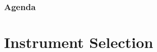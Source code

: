 
\def\PresTitle{Line Measurement}  %
\def\PresSubtitle{Baker College Engineering}         %
\def\PresAuthor{Brad Peirson}               %
\def\PresInstitute{College of Information Technology and Engineering}       %
\def\PresDate{}                             %
\def\PresKeywords{}                         %





\maketitle              %

\begin{frame}
    \frametitle{Agenda}
    \begingroup
        \setlength{\parskip}{0.3em} 
        
        
        \setcounter{tocdepth}{1} %
    \tableofcontents
    \setcounter{tocdepth}{2} %
    \endgroup
\end{frame}

\section{Instrument Selection}

